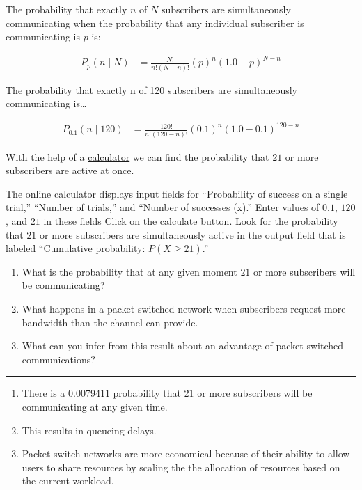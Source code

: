 \documentclass[twoside]{article}
\newenvironment{answer}
  {\vspace*{0.2cm} \rule{12cm}{0.04cm} \vspace*{0.2cm}}
  {\vspace*{0.2cm}}
\begin{document}
\begin{enumerate}
    The probability that exactly $n$ of $N$ subscribers are simultaneously communicating
    when the probability that any individual subscriber is communicating is $p$ is:

    \begin{align*}
      P_{p} (n \mid N ) & = \frac{N!}{n! (N - n)!} (p)^n (1.0 - p)^{N - n}
      \end{align*}

    The probability that exactly n of 120 subscribers are simultaneously communicating
    is\ldots

    \begin{align*}
      P_{0.1} (n \mid 120 ) & = \frac{120!}{n! (120 - n)!} (0.1)^n (1.0 - 0.1)^{120 - n}
      \end{align*}

    With the help of a \href{http://stattrek.com/online-calculator/binomial.aspx}{calculator}
    we can find the probability that $21$ or more
    subscribers are active at once.
  
    The online calculator displays input fields for ``Probability of success on a single trial,''
    ``Number of trials,'' and ``Number of successes (x).''
    Enter values of $0.1$, $120$, and $21$ in these fields
    Click on the calculate button.
    Look for the probability that $21$ or more subscribers are simultaneously active
    in the output field that is labeled ``Cumulative probability: $P(X \ge 21)$.''

    \begin{enumerate}
      \item What is the probability that at any given moment
        $21$ or more subscribers will be communicating?
      \item What happens in a packet switched network when subscribers
        request more bandwidth than the channel can provide.
      \item What can you infer from this result about an advantage
        of packet switched communications?
      \end{enumerate}

  \begin{answer}

  \begin{enumerate}
    \item There is a 0.0079411 probability that 21 or more subscribers will be communicating at any given time.
    \item This results in queueing delays.
    \item Packet switch networks are more economical because of their ability to allow users to share resources by scaling the the allocation of resources based on the current workload.
    \end{enumerate}


\end{answer}
\end{enumerate}
\end{document}
